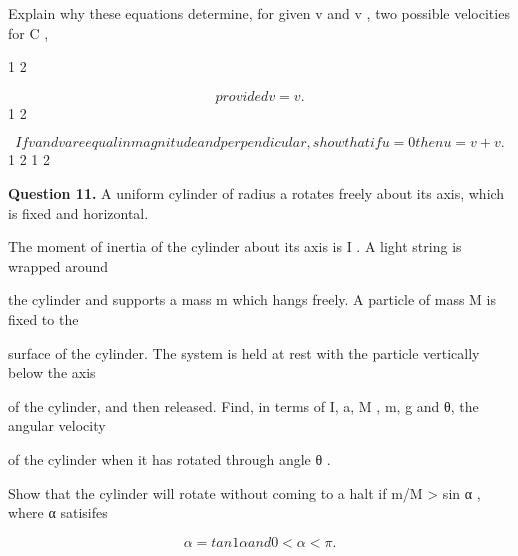 \documentclass[12pt]{article}
\begin{document}
\begin{flushleft}
Explain why these equations determine, for given v and v , two possible velocities for C ,\par
1 2\par
\[provided v = v .\]
1 2\par
\[If v and v are equal in magnitude and perpendicular, show that if u = 0 then u = v + v .\]
1 2 1 2\par
\bigskip\textbf{Question 11.} A uniform cylinder of radius a rotates freely about its axis, which is fixed and horizontal.\par
The moment of inertia of the cylinder about its axis is I . A light string is wrapped around\par
the cylinder and supports a mass m which hangs freely. A particle of mass M is fixed to the\par
surface of the cylinder. The system is held at rest with the particle vertically below the axis\par
of the cylinder, and then released. Find, in terms of I, a, M , m, g and θ, the angular velocity\par
of the cylinder when it has rotated through angle θ .\par
Show that the cylinder will rotate without coming to a halt if m/M > sin α , where α satisifes\par
\[α = tan 1 α and 0 < α < \pi .\]
\end{flushleft}
\end{document}
